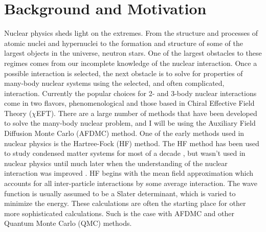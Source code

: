 \section{Background and Motivation}
Nuclear physics sheds light on the extremes. From the structure and processes of atomic nuclei and hypernuclei to the formation and structure of some of the largest objects in the universe, neutron stars. One of the largest obstacles to these regimes comes from our incomplete knowledge of the nuclear interaction. Once a possible interaction is selected, the next obstacle is to solve for properties of many-body nuclear systems using the selected, and often complicated, interaction. Currently the popular choices for 2- and 3-body nuclear interactions come in two flavors, phenomenological and those based in Chiral Effective Field Theory ($\chi$EFT). There are a large number of methods that have been developed to solve the many-body nuclear problem, and I will be using the Auxiliary Field Diffusion Monte Carlo (AFDMC) method. One of the early methods used in nuclear physics is the Hartree-Fock (HF) method. The HF method has been used to study condensed matter systems for most of a decade \cite{hartree1928, fock1930, slater1951}, but wasn't used in nuclear physics until much later when the understanding of the nuclear interaction was improved \cite{zofka1970, gogny1986}. HF begins with the mean field approximation which accounts for all inter-particle interactions by some average interaction. The wave function is usually assumed to be a Slater determinant, which is varied to minimize the energy. These calculations are often the starting place for other more sophisticated calculations. Such is the case with AFDMC and other Quantum Monte Carlo (QMC) methods.


